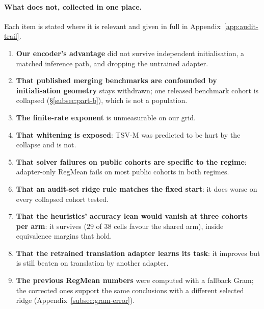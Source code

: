\paragraph{What does not, collected in one place.} Each item is stated where it
is relevant and given in full in Appendix~\ref{app:audit-trail}.
\begin{enumerate}[itemsep=1pt,topsep=2pt]
\item \textbf{Our encoder's advantage} did not survive independent
  initialisation, a matched inference path, and dropping the untrained adapter.
\item \textbf{That published merging benchmarks are confounded by
  initialisation geometry} stays withdrawn; one released benchmark cohort is
  collapsed (\S\ref{subsec:part-b}), which is not a population.
\item \textbf{The finite-rate exponent} is unmeasurable on our grid.
\item \textbf{That whitening is exposed}: TSV-M was predicted to be hurt by the
  collapse and is not.
\item \textbf{That solver failures on public cohorts are specific to the
  regime}: adapter-only RegMean fails on most public cohorts in both regimes.
\item \textbf{That an audit-set ridge rule matches the fixed start}: it does
  worse on every collapsed cohort tested.
\item \textbf{That the heuristics' accuracy lean would vanish at three cohorts
  per arm}: it survives ($29$ of $38$ cells favour the shared arm), inside
  equivalence margins that hold.
\item \textbf{That the retrained translation adapter learns its task}: it
  improves but is still beaten on translation by another adapter.
\item \textbf{The previous RegMean numbers} were computed with a fallback Gram;
  the corrected ones support the same conclusions with a different selected
  ridge (Appendix~\ref{subsec:gram-error}).
\end{enumerate}

